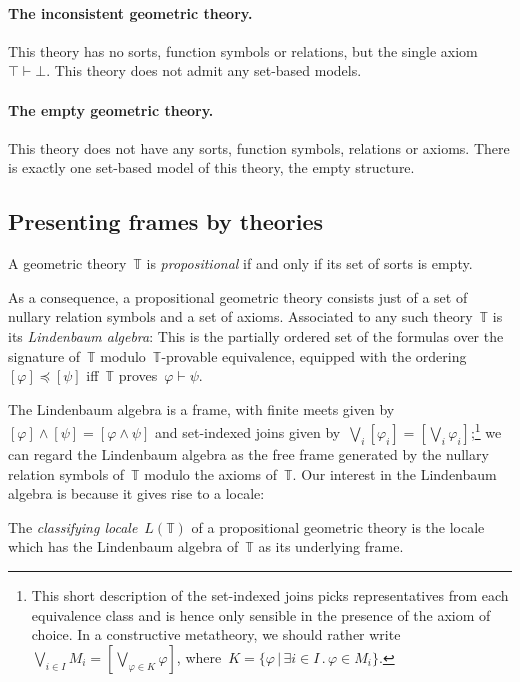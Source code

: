 \documentclass{ws-rv9x6}
\newcommand{\TT}{\mathbb{T}}
\renewcommand{\_}{\mathpunct{.}}
\newcommand{\?}{\,{:}\,}
\begin{document}
\paragraph{The inconsistent geometric theory.} This theory has no sorts,
function symbols or relations, but the single axiom $\top \vdash \bot$.
This theory does not admit any set-based models.

\paragraph{The empty geometric theory.} This theory does not have any sorts,
function symbols, relations or axioms. There is exactly one set-based model of
this theory, the empty structure.


\subsection{Presenting frames by theories}
\label{sect:presenting-frames}

\begin{definition}A geometric theory~$\TT$ is \emph{propositional} if and only
if its set of sorts is empty.\end{definition}

As a consequence, a propositional geometric theory consists just of a set of
nullary relation symbols and a set of axioms. Associated to any such
theory~$\TT$ is its \emph{Lindenbaum algebra}: This is the partially ordered
set of the formulas over the signature of~$\TT$ modulo~$\TT$-provable
equivalence, equipped with the ordering~$[\varphi] \preceq [\psi]$ iff~$\TT$
proves~$\varphi \vdash \psi$.

The Lindenbaum algebra is a frame, with finite meets given by~$[\varphi] \wedge
[\psi] = [\varphi \wedge \psi]$ and set-indexed joins given by~$\bigvee_i
[\varphi_i] = [\bigvee_i \varphi_i]$;\footnote{This short description of the
set-indexed joins picks representatives from each equivalence class and is
hence only sensible in the presence of the axiom of choice. In a
constructive metatheory, we should rather write~$\bigvee_{i \in I} M_i =
[\bigvee_{\varphi \in K} \varphi]$, where~$K = \{ \varphi \,|\, \exists i \in
I\_ \varphi \in M_i \}$.} we can regard the Lindenbaum algebra as the free
frame generated by the nullary relation symbols of~$\TT$ modulo the axioms
of~$\TT$. Our interest in the Lindenbaum algebra is because it gives rise to a
locale:

\begin{definition}The \emph{classifying locale}~$L(\TT)$ of a propositional
geometric theory is the locale which has the Lindenbaum algebra of~$\TT$ as its
underlying frame.\end{definition}
\end{document}
